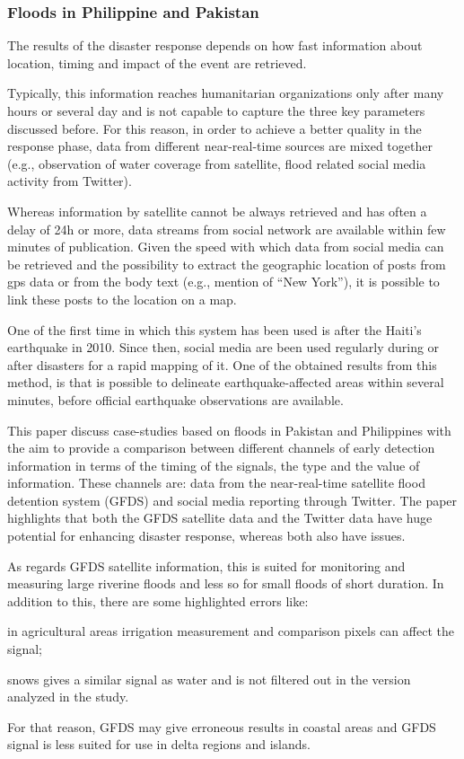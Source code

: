 \subsubsection{Floods in Philippine and Pakistan}
\noindent The results of the disaster response depends on how fast information about location, timing and impact of the event are retrieved.

\noindent Typically, this information reaches humanitarian organizations only after many hours or several day and is not capable to capture the three key parameters discussed before.
For this reason, in order to achieve a better quality in the response phase, data from different near-real-time sources are mixed together (e.g., observation of water coverage from satellite, flood related social media activity from Twitter). 

\noindent Whereas information by satellite cannot be always retrieved and has often a delay of 24h or more, data streams from social network are available within few minutes of publication. 
Given the speed with which data from social media can be retrieved and the possibility to extract the geographic location of posts from gps data or from the body text (e.g., mention of ``New York''), it is possible to link these posts to the location on a map. 

\noindent One of the first time in which this system has been used is after the Haiti's earthquake in 2010. Since then, social media are been used regularly during or after disasters for a rapid mapping of it. 
One of the obtained results from this method, is that is possible to delineate earthquake-affected areas within several minutes, before official earthquake observations are available.

\noindent This paper discuss case-studies based on floods in Pakistan and Philippines with the aim to provide a comparison between different channels of early detection information in terms of the timing of the signals, the type and the value of information. These channels are: data from the near-real-time satellite flood detention system (GFDS) and social media reporting through Twitter.
The paper highlights that both the GFDS satellite data and the Twitter data have huge potential for enhancing disaster response, whereas both also have issues.

\noindent As regards GFDS satellite information, this is suited for monitoring and measuring large riverine floods and less so for small floods of short duration. In addition to this, there are some highlighted errors like: 
\begin{list}{-}{}
	\item in agricultural areas irrigation measurement and comparison pixels can affect the signal;
	\item snows gives a similar signal as water and is not filtered out in the version analyzed in the study.
\end{list}
For that reason, GFDS may give erroneous results in coastal areas and GFDS signal is less suited for use in delta regions and islands.

